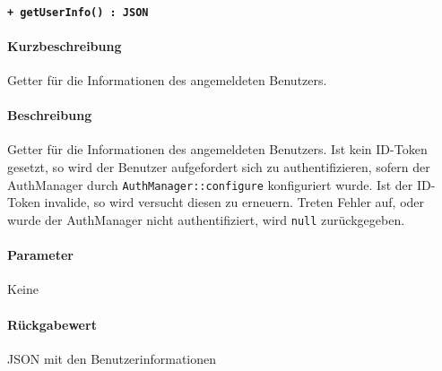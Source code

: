 \paragraph{\texttt{+ getUserInfo() : JSON}}%
\paragraph*{Kurzbeschreibung}
Getter für die Informationen des angemeldeten Benutzers.
\paragraph*{Beschreibung}
Getter für die Informationen des angemeldeten Benutzers.
Ist kein ID-Token gesetzt, so wird der Benutzer aufgefordert sich zu authentifizieren, sofern der AuthManager durch \verb#AuthManager::configure# konfiguriert wurde.
Ist der ID-Token invalide, so wird versucht diesen zu erneuern.
Treten Fehler auf, oder wurde der AuthManager nicht authentifiziert, wird \verb#null# zurückgegeben.
\paragraph*{Parameter}
Keine
\paragraph*{Rückgabewert}
JSON mit den Benutzerinformationen